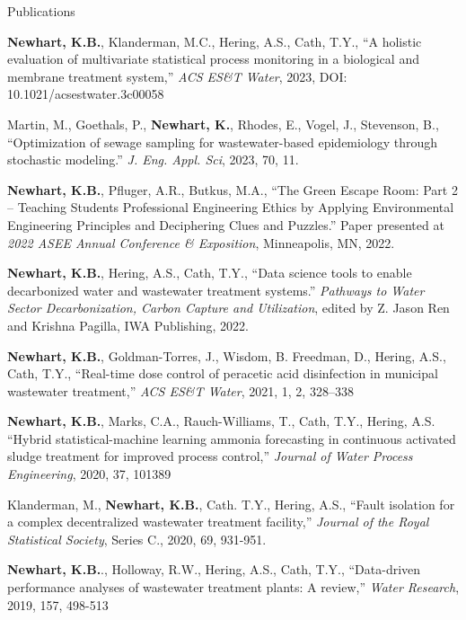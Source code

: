 \documentclass{resume} %
\begin{document}
\begin{rSection}{Publications}
\begin{etaremune}
	\item \textbf{Newhart, K.B.}, Klanderman, M.C., Hering, A.S., Cath, T.Y., ``A holistic evaluation of multivariate statistical process monitoring in a biological and membrane treatment system,'' \emph{ACS ES\&T Water}, 2023, DOI: 10.1021/acsestwater.3c00058

	\item Martin, M., Goethals, P., \textbf{Newhart, K.}, Rhodes, E., Vogel, J., Stevenson, B., ``Optimization of sewage sampling for wastewater-based epidemiology through stochastic modeling.'' \emph{J. Eng. Appl. Sci}, 2023, 70, 11.

	\item\textbf{Newhart, K.B.}, Pfluger, A.R., Butkus, M.A., ``The Green Escape Room: Part 2 – Teaching Students Professional Engineering Ethics by Applying Environmental Engineering Principles and Deciphering Clues and Puzzles.'' Paper presented at \emph{2022 ASEE Annual Conference \& Exposition}, Minneapolis, MN, 2022.

	\item \textbf{Newhart, K.B.}, Hering, A.S., Cath, T.Y., ``Data science tools to enable decarbonized water and wastewater treatment systems.'' \emph{Pathways to Water Sector Decarbonization, Carbon Capture and Utilization}, edited by Z. Jason Ren and Krishna Pagilla, IWA Publishing, 2022.

	\item \textbf{Newhart, K.B.}, Goldman-Torres, J., Wisdom, B. Freedman, D., Hering, A.S., Cath, T.Y., ``Real-time dose control of peracetic acid disinfection in municipal wastewater treatment,'' \emph{ACS ES\&T Water}, 2021, 1, 2, 328–338

	\item \textbf{Newhart, K.B.}, Marks, C.A., Rauch-Williams, T., Cath, T.Y., Hering, A.S. ``Hybrid statistical-machine learning ammonia forecasting in continuous activated sludge treatment for improved process control,'' \emph{Journal of Water Process Engineering}, 2020, 37, 101389

	\item Klanderman, M., \textbf{Newhart, K.B.}, Cath. T.Y., Hering, A.S., ``Fault isolation for a complex decentralized wastewater treatment facility,'' \emph{Journal of the Royal Statistical Society}, Series C., 2020, 69, 931-951.

	\item \textbf{Newhart, K.B.}., Holloway, R.W., Hering, A.S., Cath, T.Y., ``Data-driven performance analyses of wastewater treatment plants: A review,'' \emph{Water Research}, 2019, 157, 498-513


\end{etaremune}
\end{rSection}
\end{document}
